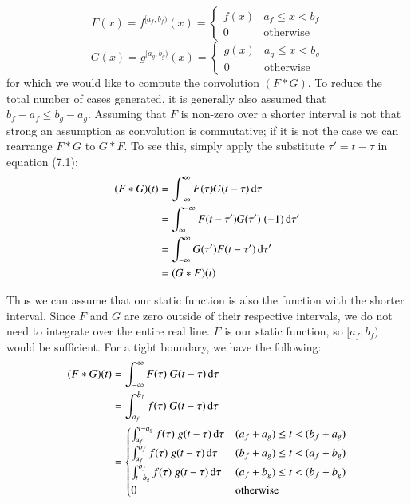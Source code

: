 \begin{equation}
	\label{eqn:fOnePiece}
	F(x)=f^{[a_f,b_f)}(x) = 
		\begin{cases}
			f(x) & a_f \leq x < b_f \\
			0 & \text{otherwise}
		\end{cases}
\end{equation}
\begin{equation}
	\label{eqn:gOnePiece}
	G(x)=g^{[a_g,b_g)}(x) = 
		\begin{cases}
			g(x) & a_g \leq x < b_g \\
			0 & \text{otherwise}
		\end{cases}
\end{equation}
for which we would like to compute the convolution $(F*G)$.
To reduce the total number of cases generated, it is generally also assumed that $b_f - a_f \leq b_g - a_g$.
Assuming that $F$ is non-zero over a shorter interval is not that strong an assumption as convolution is commutative;
if it is not the case we can rearrange $F*G$ to $G*F$.
To see this, simply apply the substitute $\tau' = t-\tau$ in equation (7.1):
\begin{align}
	\label{eqn:ConvCommutative}
	(F*G)(t) 
		&= \int_{-\infty}^\infty F(\tau) G(t-\tau) \mathop{}\!\mathrm{d} \tau 
		\notag\\&= \int_{\infty}^{-\infty} F(t-\tau')G(\tau')\; (-1) \mathop{}\!\mathrm{d}\tau' 
		\notag\\&= \int_{-\infty}^\infty G(\tau') F(t-\tau') \mathop{}\!\mathrm{d} \tau'
		\notag\\&= (G*F)(t)
\end{align}


Thus we can assume that our static function is also the function with the shorter interval.
Since $F$ and $G$ are zero outside of their respective intervals, we do not need to integrate over the entire real line. 
$F$ is our static function, so $[a_f, b_f)$ would be sufficient.
For a tight boundary, we have the following:
\begin{align}
	\label{eqn:ConvNaiveOnePiece}
	(F*G)(t) 
	&= \int_{-\infty}^\infty F(\tau)\; G(t-\tau) \mathop{}\!\mathrm{d} \tau \notag \\
	&= \int_{a_f}^{b_f} f(\tau) \; G(t-\tau) \mathop{}\!\mathrm{d} \tau \notag \\
	&= 	\begin{cases}
			\int_{a_f}^{t-a_g} f(\tau) \; g(t-\tau) \mathop{}\!\mathrm{d} \tau 	& (a_f+a_g) \leq t < (b_f+a_g) \\
			\int_{a_f}^{b_f} f(\tau) \; g(t-\tau) \mathop{}\!\mathrm{d}\tau		& (b_f+a_g) \leq t < (a_f+b_g) \\
			\int_{t-b_g}^{b_f} f(\tau) \; g(t-\tau) \mathop{}\!\mathrm{d}\tau	& (a_f+b_g) \leq t < (b_f+b_g) \\
			0										& \text{otherwise}
		\end{cases}
\end{align}



